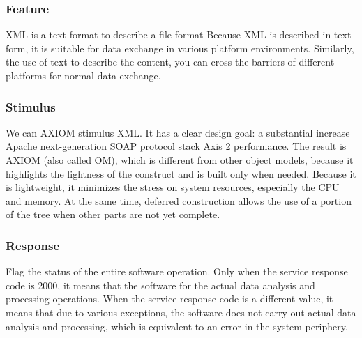 \subsubsection{Feature}
XML is a text format to describe a file format
Because XML is described in text form, it is suitable for data exchange in various platform environments. Similarly, the use of text to describe the content, you can cross the barriers of different platforms for normal data exchange.





\subsubsection{Stimulus}
We can AXIOM stimulus XML. It has a clear design goal: a substantial increase Apache next-generation SOAP protocol stack Axis 2 performance. The result is AXIOM (also called OM), which is different from other object models, because it highlights the lightness of the construct and is built only when needed. Because it is lightweight, it minimizes the stress on system resources, especially the CPU and memory. At the same time, deferred construction allows the use of a portion of the tree when other parts are not yet complete.



\subsubsection{Response}
Flag the status of the entire software operation. Only when the service response code is 2000, it means that the software for the actual data analysis and processing operations. When the service response code is a different value, it means that due to various exceptions, the software does not carry out actual data analysis and processing, which is equivalent to an error in the system periphery.

